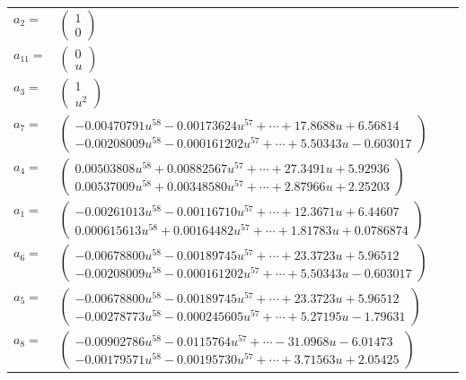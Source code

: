 \documentclass[1p]{elsarticle_modified}
\theoremstyle{definition}
\begin{document}
\begin{tabular}{m{7pt} m{180pt} m{7pt} m{180pt} }
\flushright $a_{2}=$&$\begin{pmatrix}1\\0\end{pmatrix}$ \\
\flushright $a_{11}=$&$\begin{pmatrix}0\\u\end{pmatrix}$ \\
\flushright $a_{3}=$&$\begin{pmatrix}1\\u^2\end{pmatrix}$ \\
\flushright $a_{7}=$&$\begin{pmatrix}-0.00470791 u^{58}-0.00173624 u^{57}+\cdots+17.8688 u+6.56814\\-0.00208009 u^{58}-0.000161202 u^{57}+\cdots+5.50343 u-0.603017\end{pmatrix}$ \\
\flushright $a_{4}=$&$\begin{pmatrix}0.00503808 u^{58}+0.00882567 u^{57}+\cdots+27.3491 u+5.92936\\0.00537009 u^{58}+0.00348580 u^{57}+\cdots+2.87966 u+2.25203\end{pmatrix}$ \\
\flushright $a_{1}=$&$\begin{pmatrix}-0.00261013 u^{58}-0.00116710 u^{57}+\cdots+12.3671 u+6.44607\\0.000615613 u^{58}+0.00164482 u^{57}+\cdots+1.81783 u+0.0786874\end{pmatrix}$ \\
\flushright $a_{6}=$&$\begin{pmatrix}-0.00678800 u^{58}-0.00189745 u^{57}+\cdots+23.3723 u+5.96512\\-0.00208009 u^{58}-0.000161202 u^{57}+\cdots+5.50343 u-0.603017\end{pmatrix}$ \\
\flushright $a_{5}=$&$\begin{pmatrix}-0.00678800 u^{58}-0.00189745 u^{57}+\cdots+23.3723 u+5.96512\\-0.00278773 u^{58}-0.000245605 u^{57}+\cdots+5.27195 u-1.79631\end{pmatrix}$ \\
\flushright $a_{8}=$&$\begin{pmatrix}-0.00902786 u^{58}-0.0115764 u^{57}+\cdots-31.0968 u-6.01473\\-0.00179571 u^{58}-0.00195730 u^{57}+\cdots+3.71563 u+2.05425\end{pmatrix}$ \\

\end{tabular}
\end{document}
